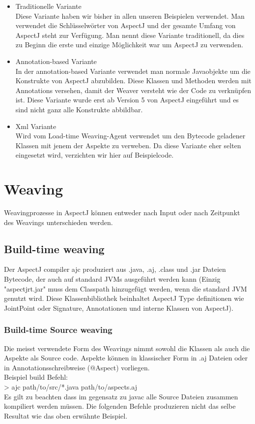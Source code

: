 \begin{itemize}
\item Traditionelle Variante \\
Diese Variante haben wir bisher in allen unseren Beispielen verwendet. Man verwendet die Schlüsselwörter von AspectJ und der gesamte Umfang von AspectJ steht zur Verfügung. Man nennt diese Variante traditionell, da dies zu Beginn die erste und einzige Möglichkeit war um AspectJ zu verwenden.
\item Annotation-based Variante \\
In der annotation-based Variante verwendet man normale Javaobjekte um die Konstrukte von AspectJ abzubilden. Diese Klassen und Methoden werden mit Annotations versehen, damit der Weaver versteht wie der Code zu verknüpfen ist. Diese Variante wurde erst ab Version 5 von AspectJ eingeführt und es sind nicht ganz alle Konstrukte abbildbar.
\item Xml Variante\\
Wird vom Load-time Weaving-Agent verwendet um den Bytecode geladener Klassen mit jenem der Aspekte zu verweben. Da diese Variante eher selten eingesetzt wird, verzichten wir hier auf Beispielcode.
\end{itemize}



\section{Weaving}
Weavingprozesse in AspectJ können entweder nach Input oder nach Zeitpunkt des Weavings unterschieden werden.

\subsection{Build-time weaving}
Der AspectJ compiler ajc produziert aus .java, .aj, .class und .jar Dateien Bytecode, der auch auf standard JVMs ausgeführt werden kann (Einzig "aspectjrt.jar" muss dem Classpath hinzugefügt werden, wenn die standard JVM genutzt wird. Diese Klassenbibliothek beinhaltet AspectJ Type definitionen wie JointPoint oder Signature, Annotationen und interne Klassen von AspectJ).
\subsubsection*{Build-time Source weaving}
Die meisst verwendete Form des Weavings nimmt sowohl die Klassen als auch die Aspekte als Source code. Aspekte können in klassischer Form in .aj Dateien oder in Annotationsschreibweise (@Aspect) vorliegen.\\
Beispiel build Befehl:\\
> ajc path/to/src/*.java path/to/aspects.aj\\
Es gilt zu beachten dass im gegensatz zu javac alle Source Dateien zusammen kompiliert werden müssen. Die folgenden Befehle produzieren nicht das selbe Resultat wie das oben erwähnte Beispiel.\\

